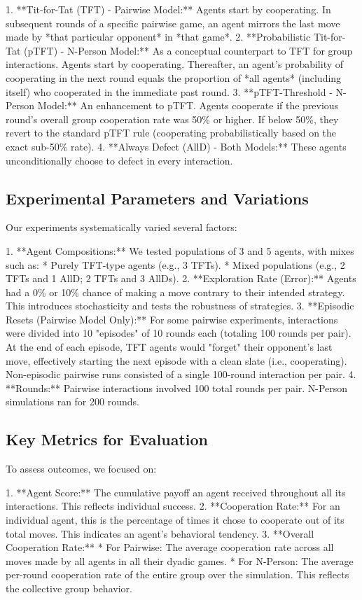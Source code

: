 \documentclass[]{llncs} %
\begin{document}
1.  **Tit-for-Tat (TFT) - Pairwise Model:** Agents start by cooperating. In subsequent rounds of a specific pairwise game, an agent mirrors the last move made by *that particular opponent* in *that game*.
2.  **Probabilistic Tit-for-Tat (pTFT) - N-Person Model:** As a conceptual counterpart to TFT for group interactions. Agents start by cooperating. Thereafter, an agent's probability of cooperating in the next round equals the proportion of *all agents* (including itself) who cooperated in the immediate past round.
3.  **pTFT-Threshold - N-Person Model:** An enhancement to pTFT. Agents cooperate if the previous round's overall group cooperation rate was 50\% or higher. If below 50\%, they revert to the standard pTFT rule (cooperating probabilistically based on the exact sub-50\% rate).
4.  **Always Defect (AllD) - Both Models:** These agents unconditionally choose to defect in every interaction.

\subsection{Experimental Parameters and Variations}
Our experiments systematically varied several factors:

1.  **Agent Compositions:** We tested populations of 3 and 5 agents, with mixes such as:
    *   Purely TFT-type agents (e.g., 3 TFTs).
    *   Mixed populations (e.g., 2 TFTs and 1 AllD; 2 TFTs and 3 AllDs).
2.  **Exploration Rate (Error):** Agents had a 0\% or 10\% chance of making a move contrary to their intended strategy. This introduces stochasticity and tests the robustness of strategies.
3.  **Episodic Resets (Pairwise Model Only):** For some pairwise experiments, interactions were divided into 10 "episodes" of 10 rounds each (totaling 100 rounds per pair). At the end of each episode, TFT agents would "forget" their opponent's last move, effectively starting the next episode with a clean slate (i.e., cooperating). Non-episodic pairwise runs consisted of a single 100-round interaction per pair.
4.  **Rounds:** Pairwise interactions involved 100 total rounds per pair. N-Person simulations ran for 200 rounds.

\subsection{Key Metrics for Evaluation}
To assess outcomes, we focused on:

1.  **Agent Score:** The cumulative payoff an agent received throughout all its interactions. This reflects individual success.
2.  **Cooperation Rate:** For an individual agent, this is the percentage of times it chose to cooperate out of its total moves. This indicates an agent's behavioral tendency.
3.  **Overall Cooperation Rate:**
    *   For Pairwise: The average cooperation rate across all moves made by all agents in all their dyadic games.
    *   For N-Person: The average per-round cooperation rate of the entire group over the simulation. This reflects the collective group behavior.
\end{document}

